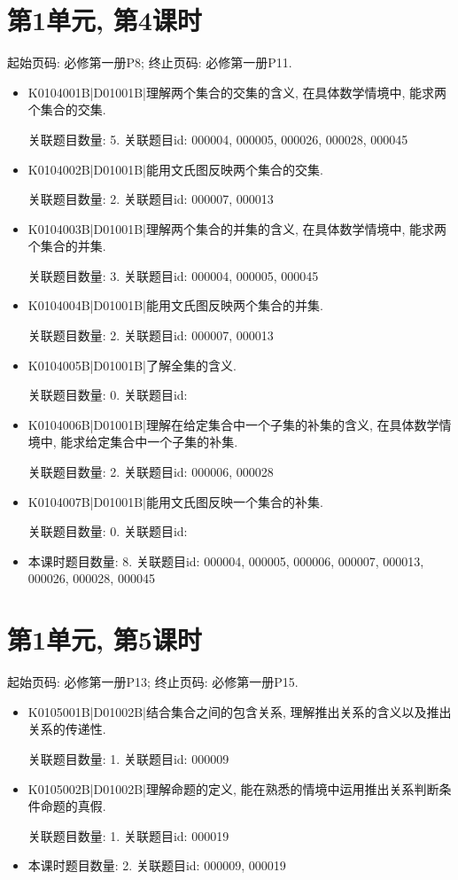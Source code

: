 \section*{第1单元, 第4课时}
起始页码: 必修第一册P8; 终止页码: 必修第一册P11.
\begin{itemize}
\item K0104001B|D01001B|理解两个集合的交集的含义, 在具体数学情境中, 能求两个集合的交集.

关联题目数量: 5. 关联题目id: 000004, 000005, 000026, 000028, 000045

\item K0104002B|D01001B|能用文氏图反映两个集合的交集.

关联题目数量: 2. 关联题目id: 000007, 000013

\item K0104003B|D01001B|理解两个集合的并集的含义, 在具体数学情境中, 能求两个集合的并集.

关联题目数量: 3. 关联题目id: 000004, 000005, 000045

\item K0104004B|D01001B|能用文氏图反映两个集合的并集.

关联题目数量: 2. 关联题目id: 000007, 000013

\item K0104005B|D01001B|了解全集的含义.

关联题目数量: 0. 关联题目id: 

\item K0104006B|D01001B|理解在给定集合中一个子集的补集的含义, 在具体数学情境中, 能求给定集合中一个子集的补集.

关联题目数量: 2. 关联题目id: 000006, 000028

\item K0104007B|D01001B|能用文氏图反映一个集合的补集.

关联题目数量: 0. 关联题目id: 

\item 本课时题目数量: 8. 关联题目id: 000004, 000005, 000006, 000007, 000013, 000026, 000028, 000045

\end{itemize}

\section*{第1单元, 第5课时}
起始页码: 必修第一册P13; 终止页码: 必修第一册P15.
\begin{itemize}
\item K0105001B|D01002B|结合集合之间的包含关系, 理解推出关系的含义以及推出关系的传递性.

关联题目数量: 1. 关联题目id: 000009

\item K0105002B|D01002B|理解命题的定义, 能在熟悉的情境中运用推出关系判断条件命题的真假.

关联题目数量: 1. 关联题目id: 000019

\item 本课时题目数量: 2. 关联题目id: 000009, 000019

\end{itemize}

